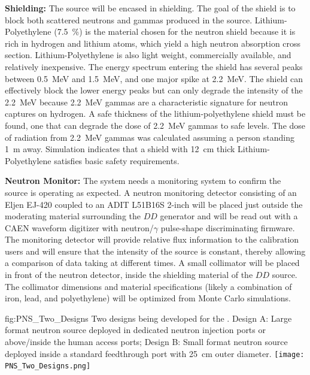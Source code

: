 {\bf Shielding:} The source will be encased in shielding. The goal of the shield is to block both scattered neutrons and gammas produced in the source. Lithium-Polyethylene (\SI{7.5}{\%}) is the material chosen for the neutron shield because it is rich in hydrogen and lithium atoms, which yield a high neutron absorption cross section. Lithium-Polyethylene is also light weight, commercially available, and relatively inexpensive. The energy spectrum entering the shield has several peaks between \SI{0.5}{\MeV} and \SI{1.5}{\MeV}, and one major spike at \SI{2.2}{\MeV}. The shield can effectively block the lower energy peaks but can only degrade the intensity of the \SI{2.2}{\MeV} because \SI{2.2}{\MeV} gammas are a characteristic signature for neutron captures on hydrogen. A safe thickness of the lithium-polyethylene shield must be found, one that can degrade the dose of \SI{2.2}{\MeV} gammas to safe levels. The dose of radiation from \SI{2.2}{\MeV} gammas was calculated assuming a person standing \SI{1}{\m} away. Simulation indicates that a shield with \SI{12}{\cm} thick Lithium-Polyethylene satisfies basic safety requirements. 

{\bf Neutron Monitor:} The system needs a monitoring system to confirm the source is operating as expected.  A neutron monitoring detector consisting of an Eljen EJ-420 coupled to an ADIT L51B16S \num{2}-inch  will be placed just outside the moderating material surrounding the $DD$ generator and will be read out with a CAEN waveform digitizer with neutron/$\gamma$ pulse-shape discriminating firmware. The monitoring detector will provide relative flux information to the calibration users and will ensure that the intensity of the source is constant, thereby allowing a comparison of data taking at different times.  A small collimator will be placed in front of the neutron detector, inside the shielding material of the $DD$ source. The collimator dimensions and material specifications (likely a combination of iron, lead, and polyethylene) will be optimized from Monte Carlo simulations.

\begin{dunefigure}{fig:PNS_Two_Designs}
{Two designs being developed for the . Design A: Large format neutron source deployed in dedicated neutron injection ports or above/inside the human access ports; Design B: Small format neutron source deployed inside a standard feedthrough port with \SI{25}{\cm} outer diameter.}
\texttt{[image: PNS\_Two\_Designs.png]}
\end{dunefigure}

